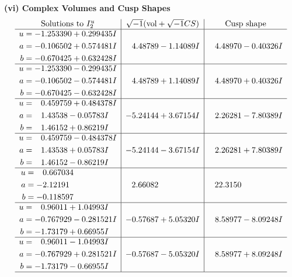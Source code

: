 \documentclass[1p]{elsarticle_modified}
\theoremstyle{definition}
\newcommand{\I}{\sqrt{-1}}
\begin{document}
\newpage\flushleft \textbf{(vi) Complex Volumes and Cusp Shapes}
$$\begin{array}{c|c|c}  
\text{Solutions to }I^u_{2}& \I (\text{vol} + \sqrt{-1}CS) & \text{Cusp shape}\\
 \hline 
\begin{aligned}
u &= -1.253390 + 0.299435 I \\
a &= -0.106502 + 0.574481 I \\
b &= -0.670425 + 0.632428 I\end{aligned}
 & \phantom{-}4.48789 - 1.14089 I & \phantom{-}4.48970 - 0.40326 I \\ \hline\begin{aligned}
u &= -1.253390 - 0.299435 I \\
a &= -0.106502 - 0.574481 I \\
b &= -0.670425 - 0.632428 I\end{aligned}
 & \phantom{-}4.48789 + 1.14089 I & \phantom{-}4.48970 + 0.40326 I \\ \hline\begin{aligned}
u &= \phantom{-}0.459759 + 0.484378 I \\
a &= \phantom{-}1.43538 - 0.05783 I \\
b &= \phantom{-}1.46152 + 0.86219 I\end{aligned}
 & -5.24144 + 3.67154 I & \phantom{-}2.26281 - 7.80389 I \\ \hline\begin{aligned}
u &= \phantom{-}0.459759 - 0.484378 I \\
a &= \phantom{-}1.43538 + 0.05783 I \\
b &= \phantom{-}1.46152 - 0.86219 I\end{aligned}
 & -5.24144 - 3.67154 I & \phantom{-}2.26281 + 7.80389 I \\ \hline\begin{aligned}
u &= \phantom{-}0.667034\phantom{ +0.000000I} \\
a &= -2.12191\phantom{ +0.000000I} \\
b &= -0.118597\phantom{ +0.000000I}\end{aligned}
 & \phantom{-}2.66082\phantom{ +0.000000I} & \phantom{-}22.3150\phantom{ +0.000000I} \\ \hline\begin{aligned}
u &= \phantom{-}0.96011 + 1.04993 I \\
a &= -0.767929 - 0.281521 I \\
b &= -1.73179 + 0.66955 I\end{aligned}
 & -0.57687 + 5.05320 I & \phantom{-}8.58977 - 8.09248 I \\ \hline\begin{aligned}
u &= \phantom{-}0.96011 - 1.04993 I \\
a &= -0.767929 + 0.281521 I \\
b &= -1.73179 - 0.66955 I\end{aligned}
 & -0.57687 - 5.05320 I & \phantom{-}8.58977 + 8.09248 I\\
 \hline 
 \end{array}$$\newpage\newpage\renewcommand{\arraystretch}{1}
\end{document}
